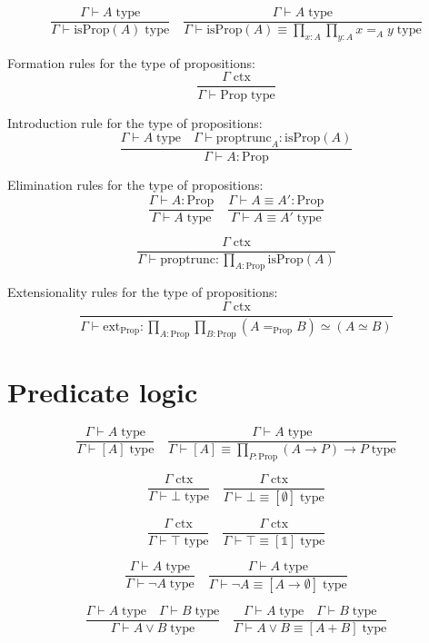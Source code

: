 \documentclass{book}
\begin{document}
$$\frac{\Gamma \vdash A \; \mathrm{type}}{\Gamma \vdash \mathrm{isProp}(A) \; \mathrm{type}} \quad \frac{\Gamma \vdash A \; \mathrm{type}}{\Gamma \vdash \mathrm{isProp}(A) \equiv \prod_{x:A} \prod_{y:A} x =_A y \; \mathrm{type}}$$

Formation rules for the type of propositions:
$$\frac{\Gamma \; \mathrm{ctx}}{\Gamma \vdash \mathrm{Prop} \; \mathrm{type}}$$

Introduction rule for the type of propositions:
$$\frac{\Gamma \vdash A \; \mathrm{type} \quad \Gamma \vdash \mathrm{proptrunc}_A:\mathrm{isProp}(A)}{\Gamma \vdash A:\mathrm{Prop}}$$

Elimination rules for the type of propositions:
$$\frac{\Gamma \vdash A:\mathrm{Prop}}{\Gamma \vdash A \; \mathrm{type}} \quad \frac{\Gamma \vdash A \equiv A':\mathrm{Prop}}{\Gamma \vdash A \equiv A' \; \mathrm{type}}$$

$$\frac{\Gamma \; \mathrm{ctx}}{\Gamma \vdash \mathrm{proptrunc}:\prod_{A:\mathrm{Prop}} \mathrm{isProp}(A)}$$

Extensionality rules for the type of propositions:
$$\frac{\Gamma \; \mathrm{ctx}}{\Gamma \vdash \mathrm{ext}_{\mathrm{Prop}}:\prod_{A:\mathrm{Prop}} \prod_{B:\mathrm{Prop}} (A =_{\mathrm{Prop}} B) \simeq (A \simeq B)}$$

\section{Predicate logic}

$$\frac{\Gamma \vdash A \; \mathrm{type}}{\Gamma \vdash [A] \; \mathrm{type}} \quad \frac{\Gamma \vdash A \; \mathrm{type}}{\Gamma \vdash [A] \equiv \prod_{P:\mathrm{Prop}} (A \to P) \to P \; \mathrm{type}}$$

$$\frac{\Gamma \; \mathrm{ctx}}{\Gamma \vdash \bot \; \mathrm{type}} \quad \frac{\Gamma \; \mathrm{ctx}}{\Gamma \vdash \bot \equiv [\emptyset] \; \mathrm{type}}$$

$$\frac{\Gamma \; \mathrm{ctx}}{\Gamma \vdash \top \; \mathrm{type}} \quad \frac{\Gamma \; \mathrm{ctx}}{\Gamma \vdash \top \equiv [\mathbb{1}] \; \mathrm{type}}$$

$$\frac{\Gamma \vdash A \; \mathrm{type}}{\Gamma \vdash \neg A \; \mathrm{type}} \quad \frac{\Gamma \vdash A \; \mathrm{type}}{\Gamma \vdash \neg A \equiv [A \to \emptyset] \; \mathrm{type}}$$

$$\frac{\Gamma \vdash A \; \mathrm{type} \quad \Gamma \vdash B \; \mathrm{type}}{\Gamma \vdash A \vee B \; \mathrm{type}} \quad \frac{\Gamma \vdash A \; \mathrm{type} \quad \Gamma \vdash B \; \mathrm{type}}{\Gamma \vdash A \vee B \equiv [A + B] \; \mathrm{type}}$$
\end{document}
